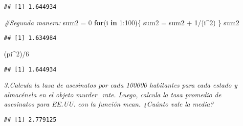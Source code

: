 \documentclass[
]{article}
\newenvironment{Shaded}{\begin{snugshade}}{\end{snugshade}}
\newcommand{\CommentTok}[1]{\textcolor[rgb]{0.56,0.35,0.01}{\textit{#1}}}
\newcommand{\ControlFlowTok}[1]{\textcolor[rgb]{0.13,0.29,0.53}{\textbf{#1}}}
\newcommand{\DecValTok}[1]{\textcolor[rgb]{0.00,0.00,0.81}{#1}}
\newcommand{\FunctionTok}[1]{\textcolor[rgb]{0.00,0.00,0.00}{#1}}
\newcommand{\NormalTok}[1]{#1}
\newcommand{\OtherTok}[1]{\textcolor[rgb]{0.56,0.35,0.01}{#1}}
\newcommand{\SpecialCharTok}[1]{\textcolor[rgb]{0.00,0.00,0.00}{#1}}
\begin{document}
\begin{verbatim}
## [1] 1.644934
\end{verbatim}

\begin{Shaded}
\begin{Highlighting}[]
\CommentTok{\#Segunda manera:}
\NormalTok{sum2 }\OtherTok{=} \DecValTok{0}
\ControlFlowTok{for}\NormalTok{(i }\ControlFlowTok{in} \DecValTok{1}\SpecialCharTok{:}\DecValTok{100}\NormalTok{)\{}
\NormalTok{  sum2 }\OtherTok{=}\NormalTok{ sum2 }\SpecialCharTok{+} \DecValTok{1}\SpecialCharTok{/}\NormalTok{(i}\SpecialCharTok{\^{}}\DecValTok{2}\NormalTok{)}
\NormalTok{\}}
\NormalTok{sum2}
\end{Highlighting}
\end{Shaded}

\begin{verbatim}
## [1] 1.634984
\end{verbatim}

\begin{Shaded}
\begin{Highlighting}[]
\NormalTok{(pi}\SpecialCharTok{\^{}}\DecValTok{2}\NormalTok{)}\SpecialCharTok{/}\DecValTok{6}
\end{Highlighting}
\end{Shaded}

\begin{verbatim}
## [1] 1.644934
\end{verbatim}

\emph{3.Calcula la tasa de asesinatos por cada 100000 habitantes para
cada estado y almacénela en el objeto murder\_rate. Luego, calcula la
tasa promedio de asesinatos para EE.UU. con la función mean. ¿Cuánto
vale la media?}

\begin{Shaded}
\end{Shaded}

\begin{verbatim}
## [1] 2.779125
\end{verbatim}
\end{document}

